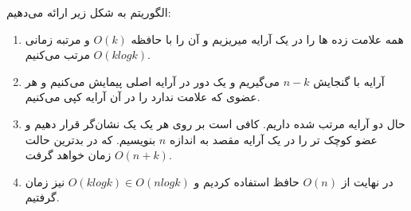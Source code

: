 الگوریتم به شکل زیر ارائه می‌دهیم:

\begin{enumerate}
	\item 
	همه علامت زده ها را در یک آرایه میریزیم و
	آن را با حافظه 
$O(k)$
و مرتبه زمانی 
$O(klogk)$
مرتب می‌کنیم.

\item 
آرایه با گنجایش 
$n-k$
می‌گیریم و یک دور در آرایه اصلی پیمایش می‌کنیم
و هر عضوی که علامت ندارد را در آن آرایه کپی می‌کنیم.

\item
حال دو آرایه مرتب شده داریم. کافی است بر روی هر یک یک نشان‌گر قرار دهیم و عضو کوچک تر را در یک آرایه مقصد به اندازه $n$ بنویسیم. که در بدترین حالت 
$O(n+k)$ 
زمان خواهد گرفت.

\item
در نهایت از 
$O(n)$
حافظ استفاده کردیم
و 
$O(klogk) \in O(nlogk)$
نیز زمان گرفتیم.

\end{enumerate}